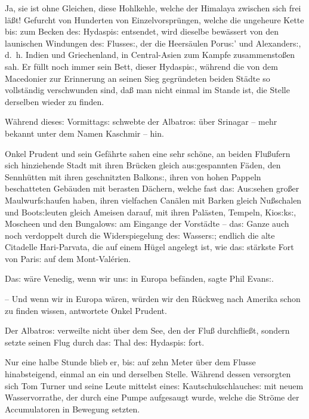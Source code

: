 \documentclass[oneside,12pt]{book}
\newcommand{\s}{s:}
\begin{document}
Ja, sie ist ohne Gleichen, diese Hohlkehle, welche der Himalaya
zwischen sich frei l\"a{\ss}t! Gefurcht von Hunderten von
Einzelvorspr\"ungen, welche die ungeheure Kette bi{\s} zum Becken
de{\s} Hydaspi{\s} entsendet, wird dieselbe bew\"assert von den
launischen Windungen de{\s} Flusse{\s}, der die Heers\"aulen
Poru{\s}' und Alexander{\s}, d.~h. Indien und Griechenland, in
Central-Asien zum Kampfe zusammensto{\ss}en sah. Er f\"ullt noch
immer sein Bett, dieser Hydaspi{\s}, w\"ahrend die von dem Macedonier
zur Erinnerung an seinen Sieg gegr\"undeten beiden St\"adte so
vollst\"andig verschwunden sind, da{\ss} man nicht einmal im Stande
ist, die Stelle derselben wieder zu finden.

W\"ahrend diese{\s} Vormittag{\s} schwebte der {\glqq}Albatro{\s}{\grqq}
\"uber Srinagar -- mehr bekannt unter dem Namen Kaschmir -- hin.

Onkel Prudent und sein Gef\"ahrte sahen eine sehr sch\"one, an beiden
Flu{\ss}ufern sich hinziehende Stadt mit ihren Br\"ucken gleich
au{\s}gespannten F\"aden, den Sennh\"utten mit ihren geschnitzten
Balkon{\s}, ihren von hohen Pappeln beschatteten Geb\"auden mit
berasten D\"achern, welche fast da{\s} Au{\s}sehen gro{\ss}er
Maulwurf{\s}haufen haben, ihren vielfachen Can\"alen mit Barken
gleich Nu{\ss}schalen und Boot{\s}leuten gleich Ameisen darauf, mit
ihren Pal\"asten, Tempeln, Kio{\s}k{\s}, Moscheen und den
Bungalow{\s} am Eingange der Vorst\"adte -- da{\s} Ganze auch noch
verdoppelt durch die Widerspiegelung de{\s} Wasser{\s}; endlich die
alte Citadelle Hari-Parvata, die auf einem H\"ugel angelegt ist, wie
da{\s} st\"arkste Fort von Pari{\s} auf dem Mont-Val\'erien.

{\glqq}Da{\s} w\"are Venedig, wenn wir un{\s} in Europa
bef\"anden,{\grqq} sagte Phil Evan{\s}.

-- Und wenn wir in Europa w\"aren, w\"urden wir den R\"uckweg nach
Amerika schon zu finden wissen,{\grqq} antwortete Onkel Prudent.

Der {\glqq}Albatro{\s}{\grqq} verweilte nicht \"uber dem See, den der
Flu{\ss} durchflie{\ss}t, sondern setzte seinen Flug durch da{\s}
Thal de{\s} Hydaspi{\s} fort.

Nur eine halbe Stunde blieb er, bi{\s} auf zehn Meter \"uber dem
Flusse hinabsteigend, einmal an ein und derselben Stelle. W\"ahrend
dessen versorgten sich Tom Turner und seine Leute mittelst eine{\s}
Kautschukschlauche{\s} mit neuem Wasservorrathe, der durch eine Pumpe
aufgesaugt wurde, welche die Str\"ome der Accumulatoren in Bewegung
setzten.
\end{document}

